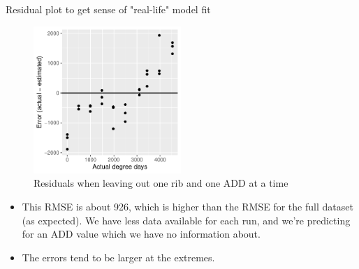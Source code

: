 \documentclass{beamer}
\begin{document}
\begin{frame}{Residual plot to get sense of "real-life" model fit}

  \begin{center}
    \begin{figure}
      \includegraphics[width=2.2in]{use_families/w_ribs/w_baseline/leave_out_one_rib_and_one_day_residuals}
      \caption{Residuals when leaving out one rib and one ADD at a time}
    \end{figure}
  \end{center}
  \vspace{-0.1in}
\scriptsize{
\begin{itemize}
  \item This RMSE is about 926, which is higher than the RMSE for the full
  dataset (as expected).  We have less data available for each run, and we're
  predicting for an ADD value which we have no information about.
  \item The errors tend to be larger at the extremes.
\end{itemize}
}

\end{frame}
\end{document}

